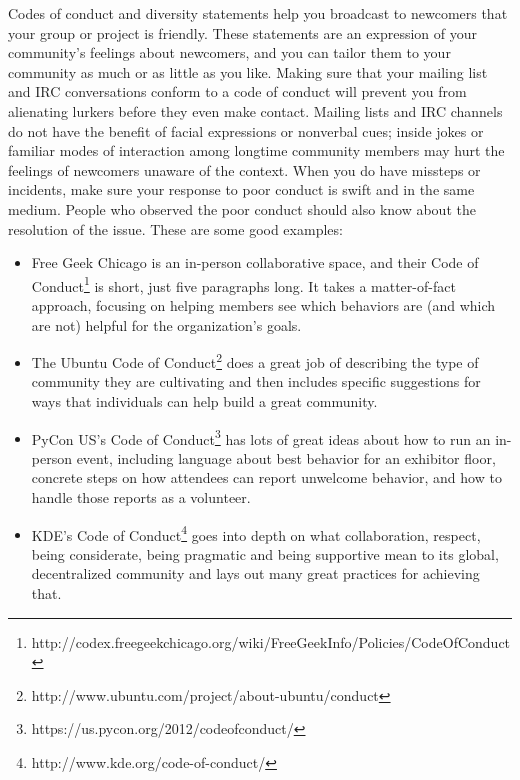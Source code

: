 Codes of conduct and diversity statements help you broadcast to newcomers that your group or project is friendly. These statements are an expression of your community’s feelings about newcomers, and you can tailor them to your community as much or as little as you like. Making sure that your mailing list and IRC conversations conform to a code of conduct will prevent you from alienating lurkers before they even make contact. Mailing lists and IRC channels do not have the benefit of facial expressions or nonverbal cues; inside jokes or familiar modes of interaction among longtime community members may hurt the feelings of newcomers unaware of the context. When you do have missteps or incidents, make sure your response to poor conduct is swift and in the same medium. People who observed the poor conduct should also know about the resolution of the issue. These are some good examples:
\begin{itemize}
  \item Free Geek Chicago is an in-person collaborative space, and their Code of Conduct\footnote{http://codex.freegeekchicago.org/wiki/FreeGeekInfo/Policies/CodeOfConduct} is short, just five paragraphs long. It takes a matter-of-fact approach, focusing on helping members see which behaviors are (and which are not) helpful for the organization’s goals.
  \item The Ubuntu Code of Conduct\footnote{http://www.ubuntu.com/project/about-ubuntu/conduct} does a great job of describing the type of community they are cultivating and then includes specific suggestions for ways that individuals can help build a great community.
  \item PyCon US's Code of Conduct\footnote{https://us.pycon.org/2012/codeofconduct/} has lots of great ideas about how to run an in-person event, including language about best behavior for an exhibitor floor, concrete steps on how attendees can report unwelcome behavior, and how to handle those reports as a volunteer.
  \item KDE’s Code of Conduct\footnote{http://www.kde.org/code-of-conduct/} goes into depth on what collaboration, respect, being considerate, being pragmatic and being supportive mean to its global, decentralized community and lays out many great practices for achieving that.
\end{itemize}

